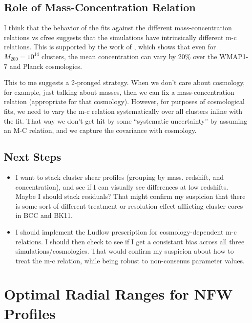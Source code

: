\documentclass[11pt]{article}
\begin{document}
\subsection{Role of Mass-Concentration Relation}

I think that the behavior of the fits against the different mass-concentration relations vs cfree suggests that the simulations have intrinsically different m-c relations. This is supported by the work of \citet{ludlow_mc}, which shows that even for $M_{200} = 10^{14}$ clusters, the mean concentration can vary by 20\% over the WMAP1-7 and Planck cosmologies. 

This to me suggests a 2-pronged strategy. When we don't care about cosmology, for example, just talking about masses, then we can fix a mass-concentration relation (appropriate for that cosmology). However, for purposes of cosmological fits, we need to vary the m-c relation systematically over all clusters inline with the fit. That way we don't get hit by some ``systematic uncertainty'' by assuming an M-C relation, and we capture the covariance with cosmology.


\subsection{Next Steps}

\begin{itemize}
\item I want to stack cluster shear profiles (grouping by mass, redshift, and concentration), and see if I can visually see differences at low redshifts. Maybe I should stack residuals? That might confirm my suspicion that there is some sort of different treatment or resolution effect afflicting cluster cores in BCC and BK11.
\item I should implement the Ludlow prescription for cosmology-dependent m-c relations. I should then check to see if I get a consistant bias across all three simulations/cosmologies. That would confirm my suspicion about how to treat the m-c relation, while being robust to non-consenus parameter values.
\end{itemize}



\section{Optimal Radial Ranges for NFW Profiles}
\end{document}
